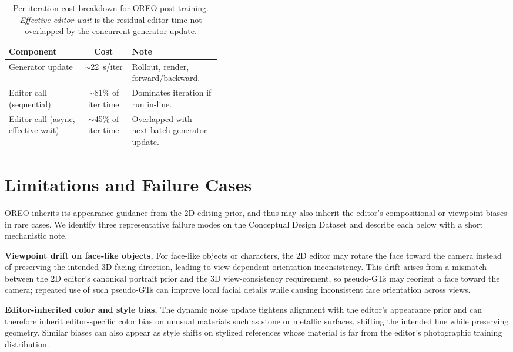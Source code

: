 \documentclass[runningheads]{llncs}
\begin{document}
\begin{table}[t]
  \centering
  \caption{Per-iteration cost breakdown for OREO post-training. \emph{Effective editor wait} is the residual editor time not overlapped by the concurrent generator update.}
  \label{tab:computational_overhead}
  \begin{tabular}{@{}lcp{0.42\linewidth}@{}}
    \toprule
    Component & Cost & Note \\
    \midrule
    Generator update & $\sim$22~s/iter & Rollout, render, forward/backward. \\
    Editor call (sequential) & $\sim$81\% of iter time & Dominates iteration if run in-line. \\
    Editor call (async, effective wait) & $\sim$45\% of iter time & Overlapped with next-batch generator update. \\
    \bottomrule
  \end{tabular}
\end{table}

\section{Limitations and Failure Cases}
\label{sec:limitations_failure}
OREO inherits its appearance guidance from the 2D editing prior, and thus may also inherit the editor's compositional or viewpoint biases in rare cases.
We identify three representative failure modes on the Conceptual Design Dataset and describe each below with a short mechanistic note.

\textbf{Viewpoint drift on face-like objects.}
For face-like objects or characters, the 2D editor may rotate the face toward the camera instead of preserving the intended 3D-facing direction, leading to view-dependent orientation inconsistency.
This drift arises from a mismatch between the 2D editor's canonical portrait prior and the 3D view-consistency requirement, so pseudo-GTs may reorient a face toward the camera; repeated use of such pseudo-GTs can improve local facial details while causing inconsistent face orientation across views.

\textbf{Editor-inherited color and style bias.}
The dynamic noise update tightens alignment with the editor's appearance prior and can therefore inherit editor-specific color bias on unusual materials such as stone or metallic surfaces, shifting the intended hue while preserving geometry.
Similar biases can also appear as style shifts on stylized references whose material is far from the editor's photographic training distribution.
\end{document}

